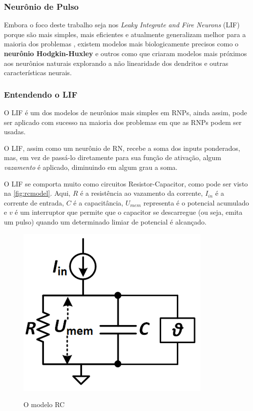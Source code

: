 			\subsubsection{Neurônio de Pulso}
				\par Embora o foco deste trabalho seja nos \textit{Leaky Integrate and Fire Neurons} (LIF) porque são mais simples, mais eficientes e atualmente generalizam melhor para a maioria dos problemas \cite{dan_goodman_2022_7044500}, existem modelos mais biologicamente precisos como o \textbf{neurônio Hodgkin-Huxley} \cite{gerstner2014neuronal} e outros como \cite{jones2020single} que criaram modelos mais próximos aos neurônios naturais explorando a não linearidade dos dendritos e outras características neurais.
		
		\subsubsection{Entendendo o LIF}
			
			\par O LIF é um dos modelos de neurônios mais simples em RNPs, ainda assim, pode ser aplicado com sucesso na maioria dos problemas em que as RNPs podem ser usadas.
			
			\par O LIF, assim como um neurônio de RN, recebe a soma dos inputs ponderados, mas, em vez de passá-lo diretamente para sua função de ativação, algum \textit{vazamento} é aplicado, diminuindo em algum grau a soma.
			
			\par O LIF se comporta muito como circuitos Resistor-Capacitor, como pode ser visto na  \autoref{fig:rcmodel}. Aqui, $R$ é a resistência ao vazamento da corrente, $I_{in}$ é a corrente de entrada, $C$ é a capacitância, $U_{mem}$ representa é o potencial acumulado e $v$ é um interruptor que permite que o capacitor se descarregue (ou seja, emita um pulso) quando um determinado limiar de potencial é alcançado.
			
			\begin{figure}[H]
				\centering
				\caption[Modelo RC]{O modelo RC}
				\includegraphics[width=0.4\linewidth]{images/rcmodel}
				\label{fig:rcmodel}
			\end{figure}
			
